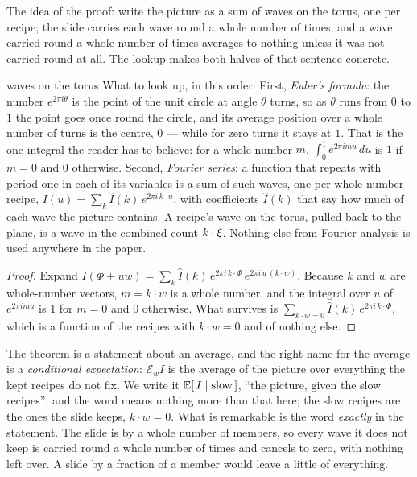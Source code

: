 The idea of the proof: write the picture as a sum of waves on the torus, one
per recipe; the slide carries each wave round a whole number of times, and
a wave carried round a whole number of times averages to nothing unless it
was not carried round at all. The lookup makes both halves of that sentence
concrete.

\begin{lookup}{waves on the torus}
What to look up, in this order. First, \emph{Euler's formula}: the number
$e^{2\pi i\theta}$ is the point of the unit circle at angle $\theta$ turns,
so as $\theta$ runs from $0$ to $1$ the point goes once round the circle,
and its average position over a whole number of turns is the centre, $0$
--- while for zero turns it stays at $1$. That is the one integral the
reader has to believe: for a whole number $m$, $\int_0^1e^{2\pi imu}\,du$ is
$1$ if $m=0$ and $0$ otherwise. Second, \emph{Fourier series}: a function
that repeats with period one in each of its variables is a sum of such
waves, one per whole-number recipe,
$I(u)=\sum_k\hat I(k)\,e^{2\pi i\,k\cdot u}$, with coefficients $\hat I(k)$
that say how much of each wave the picture contains. A recipe's wave on
the torus, pulled back to the plane, is a wave in the combined count
$k\cdot\xi$. Nothing else from Fourier analysis is used anywhere in the
paper.
\end{lookup}

\begin{proof}
Expand $I(\Phi+uw)=\sum_k\hat I(k)\,e^{2\pi i\,k\cdot\Phi}\,e^{2\pi i\,u\,(k\cdot w)}$.
Because $k$ and $w$ are whole-number vectors, $m=k\cdot w$ is a whole number,
and the integral over $u$ of $e^{2\pi i m u}$ is $1$ for $m=0$ and $0$
otherwise. What survives is $\sum_{k\cdot w=0}\hat I(k)\,e^{2\pi i\,k\cdot\Phi}$,
which is a function of the recipes with $k\cdot w=0$ and of nothing else.
\end{proof}

The theorem is a statement about an average, and the right name for the
average is a \emph{conditional expectation}: $\mathcal E_wI$ is the average of
the picture over everything the kept recipes do not fix. We write it
$\mathbb{E}[\,I\mid\text{slow}\,]$, ``the picture, given the slow recipes'', and the
word means nothing more than that here; the slow recipes are the ones the
slide keeps, $k\cdot w=0$. What is remarkable is the word \emph{exactly}
in the statement. The slide is by a whole number of members, so every wave
it does not keep is carried round a whole number of times and cancels to
zero, with nothing left over. A slide by a fraction of a member would leave
a little of everything.

